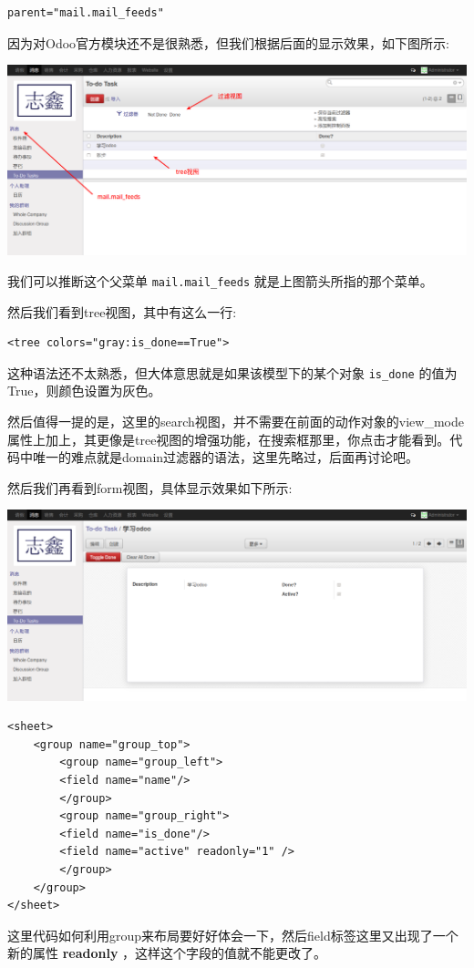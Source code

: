 \documentclass[11pt,a4paper]{sphinxmanual}
\begin{document}
\begin{Verbatim}
parent="mail.mail_feeds"
\end{Verbatim}

因为对Odoo官方模块还不是很熟悉，但我们根据后面的显示效果，如下图所示:

\includegraphics[keepaspectratio,max width=0.95\linewidth]{images/todo_task01.png}

我们可以推断这个父菜单 \verb~mail.mail_feeds~ 就是上图箭头所指的那个菜单。

然后我们看到tree视图，其中有这么一行:
\begin{Verbatim}
<tree colors="gray:is_done==True">
\end{Verbatim}

这种语法还不太熟悉，但大体意思就是如果该模型下的某个对象 \verb~is_done~ 的值为True，则颜色设置为灰色。

然后值得一提的是，这里的search视图，并不需要在前面的动作对象的view\_mode属性上加上，其更像是tree视图的增强功能，在搜索框那里，你点击才能看到。代码中唯一的难点就是domain过滤器的语法，这里先略过，后面再讨论吧。

然后我们再看到form视图，具体显示效果如下所示:

\label{todo_app-form1}
\includegraphics[keepaspectratio,max width=0.95\linewidth]{images/todo_task02.png}


\begin{Verbatim}
<sheet>
    <group name="group_top">
        <group name="group_left">
        <field name="name"/>
        </group>
        <group name="group_right">
        <field name="is_done"/>
        <field name="active" readonly="1" />
        </group>
    </group>
</sheet>
\end{Verbatim}
这里代码如何利用group来布局要好好体会一下，然后field标签这里又出现了一个新的属性 \textbf{readonly} ，这样这个字段的值就不能更改了。
\end{document}
